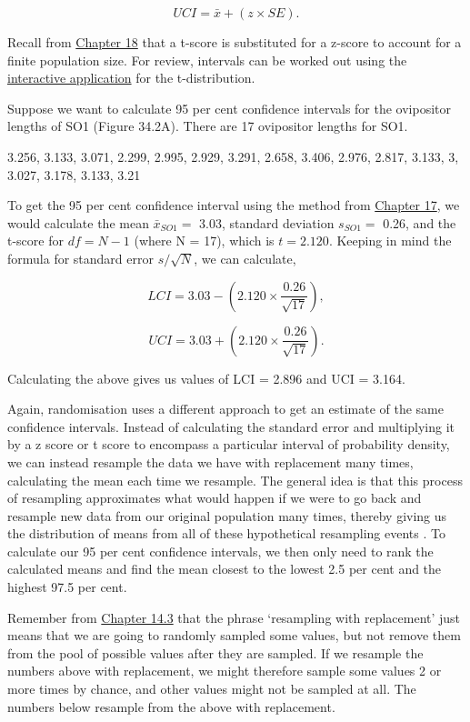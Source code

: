 \documentclass[
]{scrbook}
\begin{document}
\[UCI = \bar{x} + (z \times SE).\]

Recall from \protect\hyperlink{Chapter_18}{Chapter 18} that a t-score is substituted for a z-score to account for a finite population size.
For review, intervals can be worked out using the \href{https://bradduthie.shinyapps.io/t_score/}{interactive application} for the t-distribution.

Suppose we want to calculate 95 per cent confidence intervals for the ovipositor lengths of SO1 (Figure 34.2A).
There are 17 ovipositor lengths for SO1.

3.256, 3.133, 3.071, 2.299, 2.995, 2.929, 3.291, 2.658, 3.406, 2.976, 2.817, 3.133, 3, 3.027, 3.178, 3.133, 3.21

To get the 95 per cent confidence interval using the method from \protect\hyperlink{Chapter_17}{Chapter 17}, we would calculate the mean \(\bar{x}_{SO1} =\) 3.03, standard deviation \(s_{SO1} =\) 0.26, and the t-score for \(df = N - 1\) (where N = 17), which is \(t = 2.120\).
Keeping in mind the formula for standard error \(s/\sqrt{N}\), we can calculate,

\[LCI = 3.03 - \left(2.120 \times \frac{0.26}{\sqrt{17}}\right),\]

\[UCI = 3.03 + \left(2.120 \times \frac{0.26}{\sqrt{17}}\right).\]

Calculating the above gives us values of LCI = 2.896 and UCI = 3.164.

Again, randomisation uses a different approach to get an estimate of the same confidence intervals.
Instead of calculating the standard error and multiplying it by a z score or t score to encompass a particular interval of probability density, we can instead resample the data we have with replacement many times, calculating the mean each time we resample.
The general idea is that this process of resampling approximates what would happen if we were to go back and resample new data from our original population many times, thereby giving us the distribution of means from all of these hypothetical resampling events \citep{Manly2007}.
To calculate our 95 per cent confidence intervals, we then only need to rank the calculated means and find the mean closest to the lowest 2.5 per cent and the highest 97.5 per cent.

Remember from \protect\hyperlink{sampling-with-and-without-replacement}{Chapter 14.3} that the phrase `resampling with replacement' just means that we are going to randomly sampled some values, but not remove them from the pool of possible values after they are sampled.
If we resample the numbers above with replacement, we might therefore sample some values 2 or more times by chance, and other values might not be sampled at all.
The numbers below resample from the above with replacement.
\end{document}
